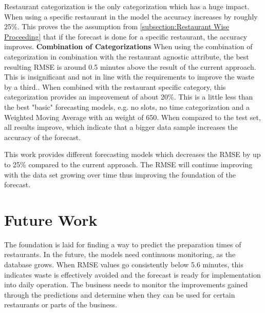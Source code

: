 Restaurant categorization is the only categorization which has a huge impact. When using a specific restaurant in the model the accuracy increases by roughly 25\%. This proves the the assumption from \ref{subsection:Restaurant Wise Proceeding} that if the forecast is done for a specific restaurant, the accuracy improves.
\newline\textbf{Combination of Categorizations}\newline
When using the combination of categorization in combination with the restaurant agnostic attribute, the best resulting RMSE is around 0.5 minutes above the result of the current approach. This is insignificant and not in line with the requirements to improve the waste by a third..\newline
When combined with the restaurant specific category, this categorization provides an improvement of about 20\%. This is a little less than the best "basic" forecasting models, e.g. no slots, no time categorization and a Weighted Moving Average with an weight of 650. When compared to the test set, all results improve, which indicate that a bigger data sample increases the accuracy of the forecast.

\newline\newline
This work provides different forecasting models which decreases the RMSE by up to 25\% compared to the current approach. The RMSE will continue improving with the data set growing over time thus improving the foundation of the forecast.
\section{Future Work}
The foundation is laid for finding a way to predict the preparation times of restaurants. In the future, the models need continuous monitoring, as the database grows. When RMSE values go consistently below 5.6 minutes, this indicates waste is effectively avoided and the forecast is ready for implementation into daily operation.\newline
The business needs to monitor the improvements gained through the predictions and determine when they can be used for certain restaurants or parts of the business.
